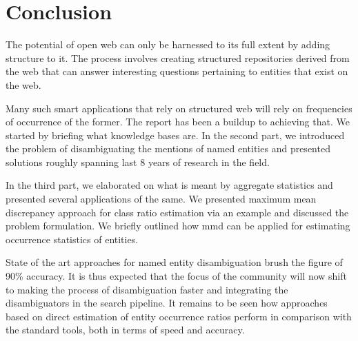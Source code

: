 \section{Conclusion}
The potential of open web can only be harnessed to its full extent by adding structure to it. The process involves 
creating structured repositories derived from the web that can answer interesting questions pertaining to entities
that exist on the web. 

Many such smart applications that rely on structured web will rely on frequencies of occurrence of the former. 
The report has been a buildup to achieving that.
We started by briefing what knowledge bases are. In the second part, we introduced the problem of disambiguating the
mentions of named entities and presented solutions roughly spanning last 8 years of research in the field. 

In the third part, we elaborated on what is meant by aggregate statistics and presented several applications of the same. 
We presented maximum mean discrepancy approach for class ratio estimation via an example and discussed the problem formulation. We briefly outlined how mmd can be applied for
 estimating occurrence statistics of entities.

State of the art approaches for named entity disambiguation brush the figure of 90\% accuracy. It is thus expected
that the focus of the community will now shift to making the process of disambiguation faster and integrating the 
disambiguators in the search pipeline. It remains to be seen how approaches based on direct estimation of entity occurrence 
ratios perform in comparison with the standard tools, both in terms of speed and accuracy. 